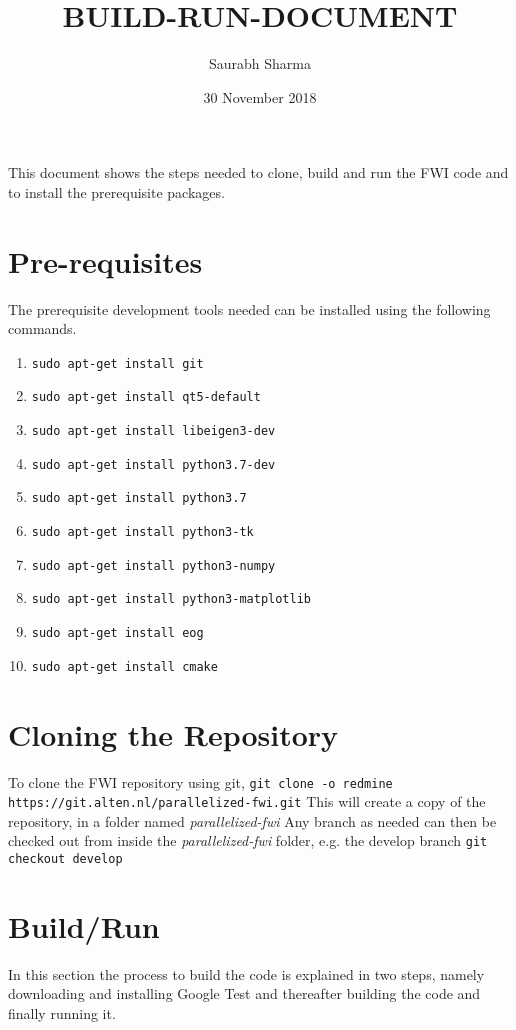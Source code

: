 \documentclass[10pt]{article}
\title{BUILD-RUN-DOCUMENT}
\author{Saurabh Sharma}
\date{30 November 2018}
\begin{document}
\maketitle
\noindent This document shows the steps needed to clone, build and run the FWI code and to install the prerequisite packages. 
\section{Pre-requisites}
The prerequisite development tools needed can be installed using the following commands.

\begin{enumerate}
    \item \texttt{sudo apt-get install git}  
    \item \texttt{sudo apt-get install qt5-default}
    \item \texttt{sudo apt-get install libeigen3-dev}
    \item \texttt{sudo apt-get install python3.7-dev}
    \item \texttt{sudo apt-get install python3.7}
    \item \texttt{sudo apt-get install python3-tk}
    \item \texttt{sudo apt-get install python3-numpy}
    \item \texttt{sudo apt-get install python3-matplotlib}
  	\item \texttt{sudo apt-get install eog}
  	\item \texttt{sudo apt-get install cmake}

\end{enumerate}


\section{Cloning the Repository}
\noindent To clone the FWI repository using git,
\newline
\texttt{git clone -o redmine https://git.alten.nl/parallelized-fwi.git}
\newline
This will create a copy of the repository, in a folder named \textit{parallelized-fwi}
\newline
Any branch as needed can then be checked out from inside the \textit{parallelized-fwi} folder, e.g. the develop branch
\newline
\texttt{git checkout develop}

\section{Build/Run}
In this section the process to build the code is explained in two steps, namely downloading and installing Google Test and thereafter building the code and finally running it.  
\end{document}
